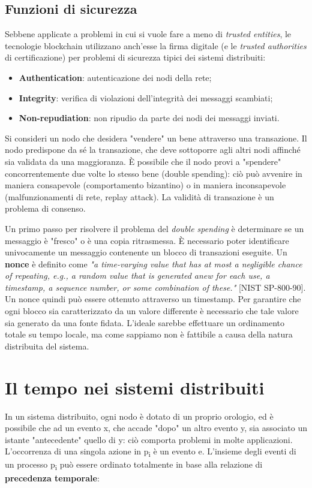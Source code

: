 \subsection{Funzioni di sicurezza}
Sebbene applicate a problemi in cui si vuole fare a meno di \textit{trusted entities}, le tecnologie blockchain utilizzano anch'esse la firma digitale (e le \textit{trusted authorities} di certificazione) per problemi di sicurezza tipici dei sistemi distribuiti:
\begin{itemize}
    \item \textbf{Authentication}: autenticazione dei nodi della rete;
    \item \textbf{Integrity}: verifica di violazioni dell'integrità dei messaggi scambiati;
    \item \textbf{Non-repudiation}: non ripudio da parte dei nodi dei messaggi inviati.
\end{itemize}
Si consideri un nodo che desidera "vendere" un bene attraverso una transazione. Il nodo predispone da sé la transazione, che deve sottoporre agli altri nodi affinché sia validata da una maggioranza. È possibile che il nodo provi a "spendere" concorrentemente due volte lo stesso bene (double spending): ciò può avvenire in maniera consapevole (comportamento bizantino) o in maniera inconsapevole (malfunzionamenti di rete, replay attack). La validità di transazione è un problema di consenso.

\vspace{5mm}

Un primo passo per risolvere il problema del \textit{double spending} è determinare se un messaggio è "fresco" o è una copia ritrasmessa. È necessario poter identificare univocamente un messaggio contenente un blocco di transazioni eseguite. Un \textbf{nonce} è definito come \textit{"a time-varying value that has at most a negligible chance of repeating, e.g., a random value that is generated anew for each use, a timestamp, a sequence number, or some combination of these."} [NIST SP-800-90]. Un nonce quindi può essere ottenuto attraverso un timestamp. Per garantire che ogni blocco sia caratterizzato da un valore differente è necessario che tale valore sia generato da una fonte fidata. L'ideale sarebbe effettuare un ordinamento totale su tempo locale, ma come sappiamo non è fattibile a causa della natura distribuita del sistema.

\section{Il tempo nei sistemi distribuiti}
In un sistema distribuito, ogni nodo è dotato di un proprio orologio, ed è possibile che ad un evento x, che accade "dopo" un altro evento y, sia associato un istante "antecedente" quello di y: ciò comporta problemi in molte applicazioni.
L'occorrenza di una singola azione in p\textsubscript{i} è un evento e. L'insieme degli eventi di un processo p\textsubscript{i} può essere ordinato totalmente in base alla relazione di \textbf{precedenza temporale}:

